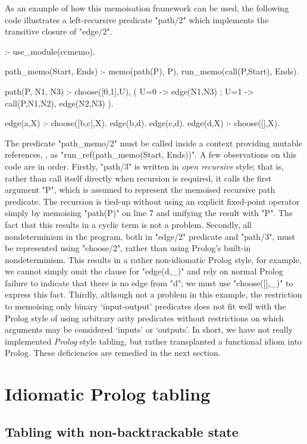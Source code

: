 As an example of how this memoisation framework can be used, the following code illustrates a left-recursive
predicate "path/2" which implements the transitive closure of "edge/2".
\begin{prolog-framed}
  :- use_module(ccmemo).

  path_memo(Start, Ends) :-
    memo(path(P), P),
    run_memo(call(P,Start), Ends).

  path(P, N1, N3) :- 
    choose([0,1],U), 
    ( U=0 -> edge(N1,N3)
    ; U=1 -> call(P,N1,N2), edge(N2,N3)
    ).

  edge(a,X) :- choose([b,c],X).
  edge(b,d).
  edge(c,d).
  edge(d,X) :- choose([],X).
\end{prolog-framed}
The predicate "path_memo/2" must be called inside a context providing mutable references, \eg, as
"run_ref(path_memo(Start, Ends))".
A few observations on this code are in order. Firstly, "path/3" is written in \emph{open recursive} style;
that is, rather than call itself directly when recursion is required, it calls the first argument "P", which
is assumed to represent the memoised recursive path predicate. The recursion is tied-up without using
an explicit fixed-point operator simply by memoising "path(P)" on line 7 and unifying the result with "P".
The fact that this results in a cyclic term is not a problem. Secondly, all nondeterminism in the
program, both in "edge/2" predicate and "path/3", must be represented using "choose/2",
rather than using Prolog's built-in nondeterminism. This results in a rather non-idiomatic Prolog style, for
example, we cannot simply omit the clause for "edge(d,_)" and rely on normal Prolog failure to indicate that there is no edge 
from "d"; we must use "choose([],_)" to express this fact. Thirdly, although not a problem in this example,
the restriction to memoising only binary `input-output' predicates does not fit well with the Prolog style
of using arbitrary arity predicates without restrictions on which arguments may be considered
`inputs' or `outputs'. In short, we have not really implemented \emph{Prolog} style tabling, but rather
transplanted a functional idiom into Prolog. These deficiencies are remedied in the next section.


\section{Idiomatic Prolog tabling}

\subsection{Tabling with non-backtrackable state}
\label{sec:ccnbenv}

